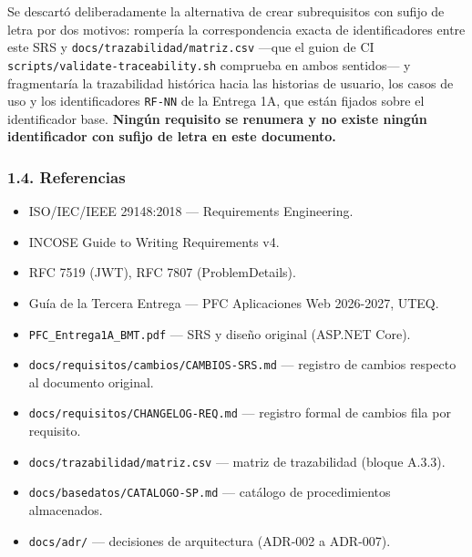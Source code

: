 \documentclass[
  spanish,
]{article}
\providecommand{\tightlist}{%
  \setlength{\itemsep}{0pt}\setlength{\parskip}{0pt}}
\begin{document}
Se descartó deliberadamente la alternativa de crear subrequisitos con
sufijo de letra por dos motivos: rompería la correspondencia exacta de
identificadores entre este SRS y \texttt{docs/\allowbreak{}trazabilidad/\allowbreak{}matriz.\allowbreak{}csv}
---que el guion de CI \texttt{scripts/\allowbreak{}validate-\allowbreak{}traceability.\allowbreak{}sh}
comprueba en ambos sentidos--- y fragmentaría la trazabilidad histórica
hacia las historias de usuario, los casos de uso y los identificadores
\texttt{RF-\allowbreak{}NN} de la Entrega 1A, que están fijados sobre el
identificador base. \textbf{Ningún requisito se renumera y no existe
ningún identificador con sufijo de letra en este documento.}

\subsubsection{1.4. Referencias}\label{referencias}

\begin{itemize}
\tightlist
\item
  ISO/IEC/IEEE 29148:2018 --- Requirements Engineering.
\item
  INCOSE Guide to Writing Requirements v4.
\item
  RFC 7519 (JWT), RFC 7807 (ProblemDetails).
\item
  Guía de la Tercera Entrega --- PFC Aplicaciones Web 2026-2027, UTEQ.
\item
  \texttt{PFC\_\allowbreak{}Entrega1\allowbreak{}A\_\allowbreak{}BMT.\allowbreak{}pdf} --- SRS y diseño original (ASP.NET
  Core).
\item
  \texttt{docs/\allowbreak{}requisitos/\allowbreak{}cambios/\allowbreak{}CAMBIOS-\allowbreak{}SRS.\allowbreak{}md} --- registro de
  cambios respecto al documento original.
\item
  \texttt{docs/\allowbreak{}requisitos/\allowbreak{}CHANGELOG-\allowbreak{}REQ.\allowbreak{}md} --- registro formal de
  cambios fila por requisito.
\item
  \texttt{docs/\allowbreak{}trazabilidad/\allowbreak{}matriz.\allowbreak{}csv} --- matriz de trazabilidad
  (bloque A.3.3).
\item
  \texttt{docs/\allowbreak{}basedatos/\allowbreak{}CATALOGO-\allowbreak{}SP.\allowbreak{}md} --- catálogo de procedimientos
  almacenados.
\item
  \texttt{docs/\allowbreak{}adr/} --- decisiones de arquitectura (ADR-002 a ADR-007).
\end{itemize}
\end{document}

